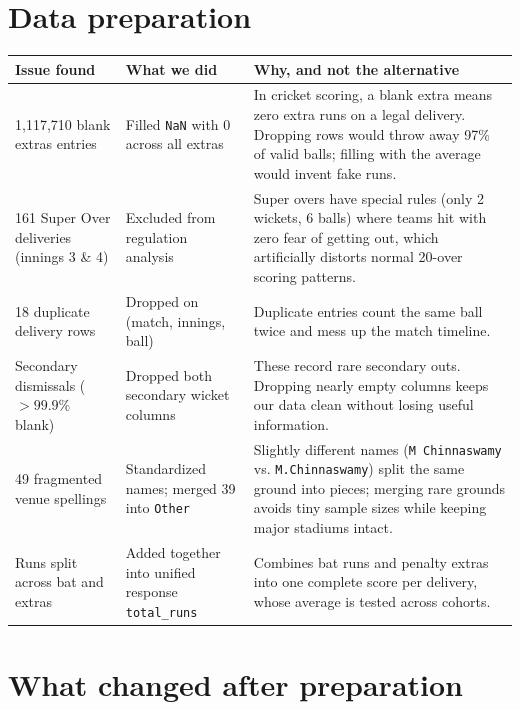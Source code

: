 \documentclass[10pt,a4paper,twocolumn]{article}
\newif\ifshowhints
\newcommand{\hint}[1]{\ifshowhints{\footnotesize\itshape\color{hintgrey}#1\par}\fi}
\newcommand{\code}[1]{\texttt{#1}}
\begin{document}
\section{Data preparation}
\hint{How did you prepare your data (encoding, outliers, missing values, duplicates), and why do
you follow such steps? One row per step; the ``why'' matters most.}

{\footnotesize
\begin{tabularx}{\linewidth}{@{}L{2.0cm} L{2.2cm} Y@{}}
\toprule
\textbf{Issue found} & \textbf{What we did} & \textbf{Why, and not the alternative} \\
117{,}710 blank extras entries & Filled \code{NaN} with 0 across all extras & In cricket scoring, a blank extra means zero extra runs on a legal delivery. Dropping rows would throw away 97\% of valid balls; filling with the average would invent fake runs. \\
161 Super Over deliveries (innings 3 \& 4) & Excluded from regulation analysis & Super overs have special rules (only 2 wickets, 6 balls) where teams hit with zero fear of getting out, which artificially distorts normal 20-over scoring patterns. \\
18 duplicate delivery rows & Dropped on (match, innings, ball) & Duplicate entries count the same ball twice and mess up the match timeline. \\
Secondary dismissals ($>99.9\%$ blank) & Dropped both secondary wicket columns & These record rare secondary outs. Dropping nearly empty columns keeps our data clean without losing useful information. \\
49 fragmented venue spellings & Standardized names; merged 39 into \code{Other} & Slightly different names (\code{M Chinnaswamy} vs. \code{M.Chinnaswamy}) split the same ground into pieces; merging rare grounds avoids tiny sample sizes while keeping major stadiums intact. \\
Runs split across bat and extras & Added together into unified response \code{total\_runs} & Combines bat runs and penalty extras into one complete score per delivery, whose average is tested across cohorts. \\
\bottomrule
\end{tabularx}}

\section{What changed after preparation}
\hint{What are the changes you got after data preparation? Give before-and-after observations.}
\end{document}
